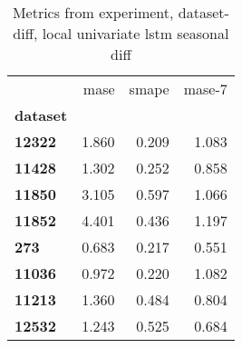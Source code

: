 \begin{table}[h]
\centering
\caption{Metrics from experiment, dataset-diff, local univariate lstm seasonal diff}
\label{table:local-univariate-lstm-seasonal-diff-dataset-diff}
\begin{tabular}{lrrr}
\toprule
{} &   mase &  smape &  mase-7 \\
\textbf{dataset} &        &        &         \\
\midrule
\textbf{12322  } &  1.860 &  0.209 &   1.083 \\
\textbf{11428  } &  1.302 &  0.252 &   0.858 \\
\textbf{11850  } &  3.105 &  0.597 &   1.066 \\
\textbf{11852  } &  4.401 &  0.436 &   1.197 \\
\textbf{273    } &  0.683 &  0.217 &   0.551 \\
\textbf{11036  } &  0.972 &  0.220 &   1.082 \\
\textbf{11213  } &  1.360 &  0.484 &   0.804 \\
\textbf{12532  } &  1.243 &  0.525 &   0.684 \\
\bottomrule
\end{tabular}
\end{table}
